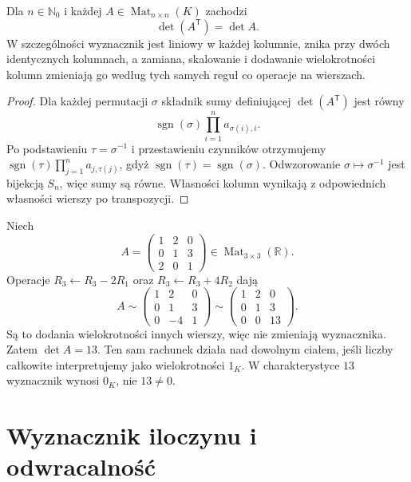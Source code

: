\begin{stwierdzenie}
\label{prop:lin6-transpozycja}
Dla \(n\in\mathbb N_0\) i każdej
\(A\in\operatorname{Mat}_{n\times n}(K)\)
zachodzi
\[
 \det(A^{\mathsf T})=\det A.
\]
W szczególności wyznacznik jest
liniowy w każdej kolumnie,
znika przy dwóch identycznych kolumnach,
a zamiana, skalowanie i dodawanie
wielokrotności kolumn zmieniają go
według tych samych reguł co operacje
na wierszach.
\end{stwierdzenie}
\begin{proof}
Dla każdej permutacji \(\sigma\)
składnik sumy definiującej
\(\det(A^{\mathsf T})\) jest równy
\[
 \operatorname{sgn}(\sigma)
 \prod_{i=1}^n a_{\sigma(i),i}.
\]
Po podstawieniu \(\tau=\sigma^{-1}\)
i przestawieniu czynników
otrzymujemy
\(\operatorname{sgn}(\tau)
\prod_{j=1}^n a_{j,\tau(j)}\),
gdyż
\(\operatorname{sgn}(\tau)=
\operatorname{sgn}(\sigma)\).
Odwzorowanie \(\sigma\mapsto\sigma^{-1}\)
jest bijekcją \(S_n\), więc sumy są równe.
Własności kolumn wynikają z odpowiednich
własności wierszy po transpozycji.
\end{proof}

\begin{przyklad}
\label{prz:lin6-eliminacja}
Niech
\[
 A=\begin{pmatrix}
 1&2&0\\
 0&1&3\\
 2&0&1
 \end{pmatrix}
 \in\operatorname{Mat}_{3\times3}(\mathbb R).
\]
Operacje
\(R_3\leftarrow R_3-2R_1\)
oraz
\(R_3\leftarrow R_3+4R_2\)
dają
\[
 A\sim
 \begin{pmatrix}
 1&2&0\\
 0&1&3\\
 0&-4&1
 \end{pmatrix}
 \sim
 \begin{pmatrix}
 1&2&0\\
 0&1&3\\
 0&0&13
 \end{pmatrix}.
\]
Są to dodania wielokrotności
innych wierszy, więc nie zmieniają
wyznacznika. Zatem \(\det A=13\).
Ten sam rachunek działa nad dowolnym ciałem,
jeśli liczby całkowite interpretujemy
jako wielokrotności \(1_K\).
W charakterystyce \(13\) wyznacznik
wynosi \(0_K\), nie \(13\ne0\).
\end{przyklad}

\section{Wyznacznik iloczynu i odwracalność}
\label{sec:lin6-mnozenie}

